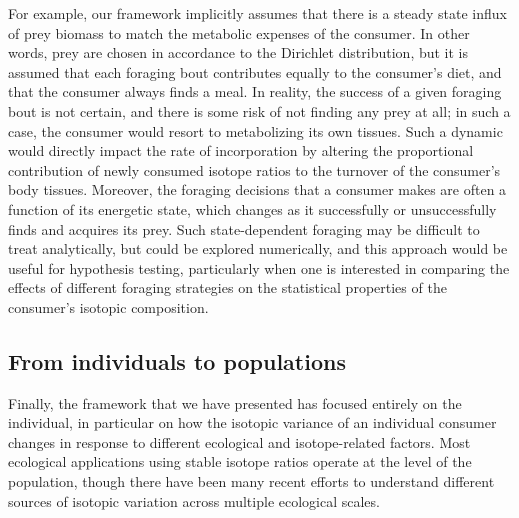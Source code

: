 \documentclass{frontiersSCNS}
\begin{document}
For example, our framework implicitly assumes that there is a steady state influx of prey biomass to match the metabolic expenses of the consumer.
In other words, prey are chosen in accordance to the Dirichlet distribution, but it is assumed that each foraging bout contributes equally to the consumer's diet, and that the consumer always finds a meal.
In reality, the success of a given foraging bout is not certain, and there is some risk of not finding any prey at all; in such a case, the consumer would resort to metabolizing its own tissues.
Such a dynamic would directly impact the rate of incorporation by altering the proportional contribution of newly consumed isotope ratios to the turnover of the consumer's body tissues.
Moreover, the foraging decisions that a consumer makes are often a function of its energetic state, which changes as it successfully or unsuccessfully finds and acquires its prey.
Such state-dependent foraging may be difficult to treat analytically, but could be explored numerically, and this approach would be useful for hypothesis testing, particularly when one is interested in comparing the effects of different foraging strategies on the statistical properties of the consumer's isotopic composition.




\subsection*{From individuals to populations}
Finally, the framework that we have presented has focused entirely on the individual, in particular on how the isotopic variance of an individual consumer changes in response to different ecological and isotope-related factors.
Most ecological applications using stable isotope ratios operate at the level of the population, though there have been many recent efforts to understand different sources of isotopic variation across multiple ecological scales.
\end{document}
